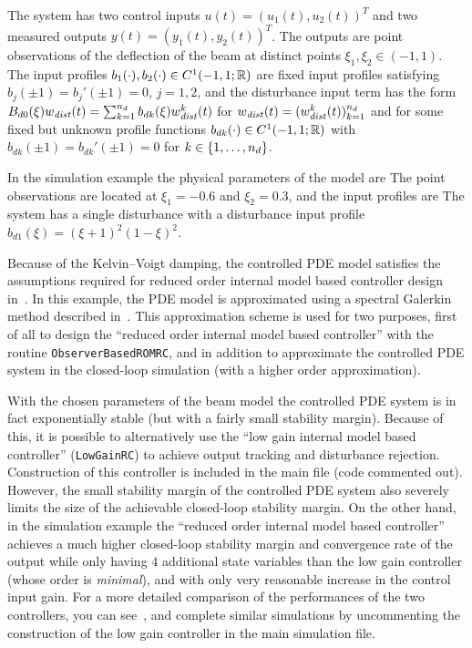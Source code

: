 \documentclass[11pt, a4paper]{amsart}
\theoremstyle{definition}
\numberwithin{equation}{section}
\newcommand{\wdist}{w_{\mbox{\scriptsize\textit{dist}}}}
\begin{document}
The system has two control inputs $u(t)=(u_1(t),u_2(t))^T$ and two measured outputs $y(t)=(y_1(t),y_2(t))^T$.
The outputs are point observations of the deflection of the beam at distinct points $\xi_1,\xi_2\in(-1,1)$.
The input profiles
$b_1(\cdot),b_2(\cdot)\in C^1(-1,1;{\mathbb{R}})$
are fixed input profiles satisfying $b_j(\pm 1)=b_j'(\pm 1)=0$, $j=1,2$, 
and the disturbance input term has the form $B_{d0}(\xi)\wdist(t) = \sum_{k=1}^{n_d}b_{dk}(\xi)\wdist^k(t)$ for $\wdist(t)=(\wdist^k(t))_{k=1}^{n_d}$ and for some fixed but unknown profile functions $b_{dk}(\cdot)\in C^1(-1,1;{\mathbb{R}})$ with $b_{dk}(\pm 1)=b_{dk}'(\pm 1)=0$ for $k\in \{1,\ldots,n_d\}$.



In the simulation example the physical parameters of the model are 
The point observations are located at $\xi_1=-0.6$ and $\xi_2=0.3$, and the input profiles are
The system has a
single disturbance with a disturbance input profile 
$b_{d1}(\xi) = (\xi+1)^2(1-\xi)^2$.


Because of the Kelvin--Voigt damping, the controlled PDE model satisfies the assumptions required for reduced order internal model based controller design in~\cite{PauPha20}.
In this example, the PDE model is approximated using a spectral Galerkin method described in~\cite{She95}. This approximation scheme is used for two purposes, first of all to design the ``reduced order internal model based controller'' with the routine \texttt{ObserverBasedROMRC}, and in addition to approximate the controlled PDE system in the closed-loop simulation (with a higher order approximation).

With the chosen parameters of the beam model the controlled PDE system is in fact exponentially stable (but with a fairly small stability margin). Because of this, it is possible to alternatively use the ``low gain internal model based controller'' (\texttt{LowGainRC}) to achieve output tracking and disturbance rejection. Construction of this controller is included in the main file (code commented out). However, the small stability margin of the controlled PDE system also severely limits the size of the achievable closed-loop stability margin. On the other hand, in the simulation example the ``reduced order internal model based controller'' achieves a much higher closed-loop stability margin and convergence rate of the output while only having $4$ additional state variables than the low gain controller (whose order is \emph{minimal}), and with only very reasonable increase in the control input gain. For a more detailed comparison of the performances of the two controllers, you can see~, and complete similar simulations by uncommenting the construction of the low gain controller in the main simulation file.
\end{document}
